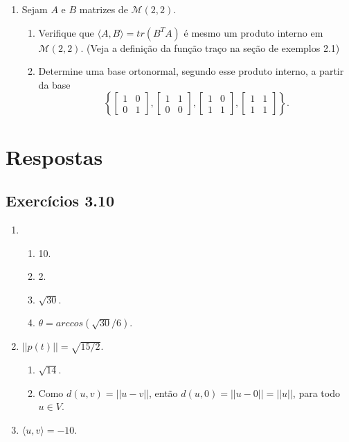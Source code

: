 \begin{enumerate}
  \item Sejam $A$ e $B$ matrizes de $\mathcal{M}(2,2)$.
    \begin{enumerate}
       \item Verifique que $\langle A, B\rangle = tr(B^TA) $ é mesmo um produto interno em $\mathcal{M}(2,2)$. (Veja a definição da função traço na seção de exemplos 2.1)
       \item  Determine uma  base ortonormal, segundo esse produto interno, a partir da base
        $$
        \left\{   \left[\begin{array}{cc} 1&0  \\ 0&  1  \end{array}\right],  \left[\begin{array}{cc} 1&1  \\0 &  0  \end{array}\right],  \left[\begin{array}{cc}1 &0  \\ 1&  1  \end{array}\right],  \left[\begin{array}{cc} 1& 1 \\ 1&1    \end{array}\right]
        \right\}.
        $$
    \end{enumerate}
\end{enumerate}

\section{Respostas}

\subsection{Exercícios 3.10}

\begin{enumerate}
  \item
  \begin{enumerate}[label=(\alph*)]
    \item 10.
    \item 2.
    \item $\sqrt{30}$.
    \item $\theta=arccos(\sqrt{30}/6)$.
  \end{enumerate}

  \item $||p(t)||= \sqrt{15/2}$.
    \begin{enumerate}[label=(\alph*)]
      \item $\sqrt{14}$.
      \item Como $d(u,v)=||u-v||$, então $d(u, 0)=||u-0||=||u||$, para todo $ u \in V$.
    \end{enumerate}

  \item $\langle u, v \rangle = -10$.
\end{enumerate}

